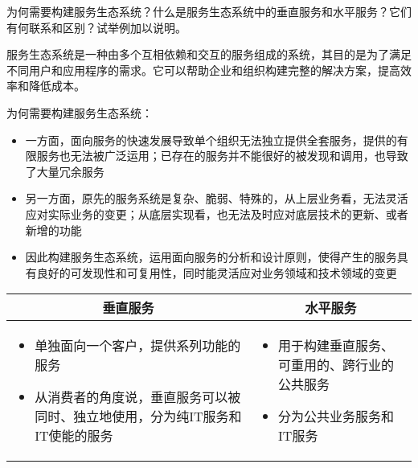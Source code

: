\begin{problem}
    为何需要构建服务生态系统？什么是服务生态系统中的垂直服务和水平服务？它们有何联系和区别？试举例加以说明。
    \end{problem}
    
    \begin{solution}
    服务生态系统是一种由多个互相依赖和交互的服务组成的系统，其目的是为了满足不同用户和应用程序的需求。它可以帮助企业和组织构建完整的解决方案，提高效率和降低成本。
    
    为何需要构建服务生态系统：
    \begin{itemize}
        \item 一方面，面向服务的快速发展导致单个组织无法独立提供全套服务，提供的有限服务也无法被广泛运用；已存在的服务并不能很好的被发现和调用，也导致了大量冗余服务
        \item 另一方面，原先的服务系统是复杂、脆弱、特殊的，从上层业务看，无法灵活应对实际业务的变更；从底层实现看，也无法及时应对底层技术的更新、或者新增的功能
        \item 因此构建服务生态系统，运用面向服务的分析和设计原则，使得产生的服务具有良好的可发现性和可复用性，同时能灵活应对业务领域和技术领域的变更
    \end{itemize}
    
    \begin{spacing}{1.2}
        \vspace{-0.5em}
        \begin{longtable}{|m{7.5cm}|m{7.5cm}|}
            \hline
            \multicolumn{1}{|c|}{\textbf{垂直服务}} & \multicolumn{1}{c|}{\textbf{水平服务}} \\ \hline
            \vspace{-1.3em}
            \begin{itemize}[leftmargin=1.5em,itemsep=-3pt]
                \item 单独面向一个客户，提供系列功能的服务
                \item 从消费者的角度说，垂直服务可以被同时、独立地使用，分为纯IT服务和IT使能的服务
            \vspace{-1.5em}
            \end{itemize}                                           
                & 
            \vspace{-1.3em}
            \begin{itemize}[leftmargin=1.5em,itemsep=-3pt]
                \item 用于构建垂直服务、可重用的、跨行业的公共服务
                \item 分为公共业务服务和IT服务
            \vspace{-1.5em}
            \end{itemize}  
            \\ \hline
        \end{longtable}
        \vspace{-1em}
    \end{spacing}
    

\end{solution}
